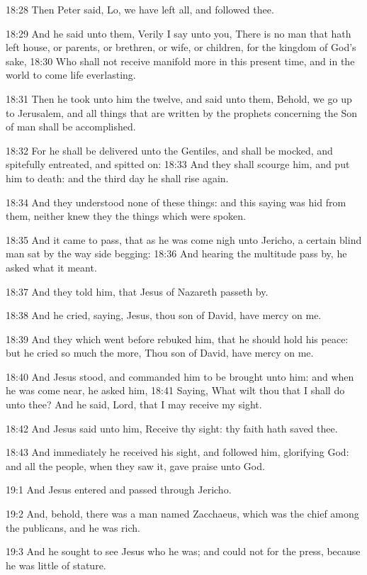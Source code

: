 18:28 Then Peter said, Lo, we have left all, and followed thee.

18:29 And he said unto them, Verily I say unto you, There is no man that hath left house, or parents, or brethren, or wife, or children, for the kingdom of God's sake, 18:30 Who shall not receive manifold more in this present time, and in the world to come life everlasting.

18:31 Then he took unto him the twelve, and said unto them, Behold, we go up to Jerusalem, and all things that are written by the prophets concerning the Son of man shall be accomplished.

18:32 For he shall be delivered unto the Gentiles, and shall be mocked, and spitefully entreated, and spitted on: 18:33 And they shall scourge him, and put him to death: and the third day he shall rise again.

18:34 And they understood none of these things: and this saying was hid from them, neither knew they the things which were spoken.

18:35 And it came to pass, that as he was come nigh unto Jericho, a certain blind man sat by the way side begging: 18:36 And hearing the multitude pass by, he asked what it meant.

18:37 And they told him, that Jesus of Nazareth passeth by.

18:38 And he cried, saying, Jesus, thou son of David, have mercy on me.

18:39 And they which went before rebuked him, that he should hold his peace: but he cried so much the more, Thou son of David, have mercy on me.

18:40 And Jesus stood, and commanded him to be brought unto him: and when he was come near, he asked him, 18:41 Saying, What wilt thou that I shall do unto thee? And he said, Lord, that I may receive my sight.

18:42 And Jesus said unto him, Receive thy sight: thy faith hath saved thee.

18:43 And immediately he received his sight, and followed him, glorifying God: and all the people, when they saw it, gave praise unto God.

19:1 And Jesus entered and passed through Jericho.

19:2 And, behold, there was a man named Zacchaeus, which was the chief among the publicans, and he was rich.

19:3 And he sought to see Jesus who he was; and could not for the press, because he was little of stature.

